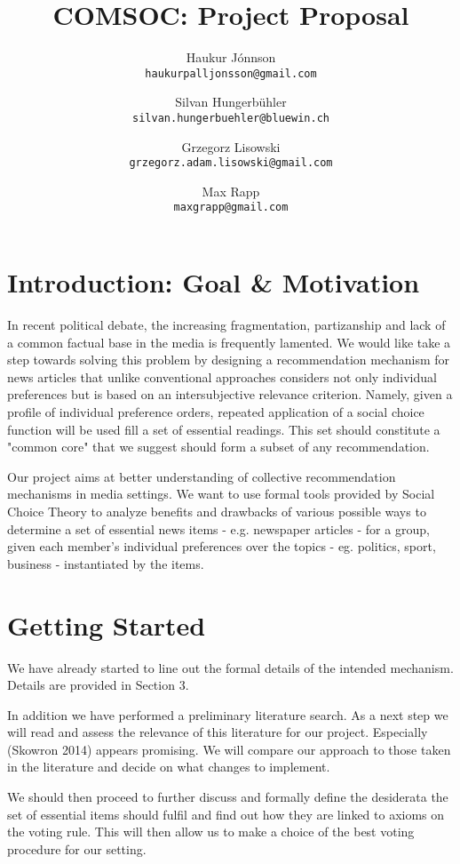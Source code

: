 \documentclass[10pt,a4paper, english]{article}
\author{
    Haukur J{\'o}nnson\\    \texttt{haukurpalljonsson@gmail.com}
    \and
    Silvan Hungerb{\"u}hler\\   \texttt{silvan.hungerbuehler@bluewin.ch}
    \and
    Grzegorz Lisowski\\  \texttt{grzegorz.adam.lisowski@gmail.com}
    \and
    Max Rapp\\  \texttt{maxgrapp@gmail.com}
}
\title{%
  COMSOC: Project Proposal}
\date{}
\begin{document}
\maketitle

\section{Introduction: Goal \& Motivation}

In recent political debate, the increasing fragmentation, partizanship and lack of a common factual base in the media is frequently lamented. We would like take a step towards solving this problem by designing a recommendation mechanism for news articles that unlike conventional approaches considers not only individual preferences but is based on an intersubjective relevance criterion. Namely, given a profile of individual preference orders, repeated application of a social choice function will be used fill a set of essential readings. This set should constitute a "common core" that we suggest should form a subset of any recommendation.

Our project aims at better understanding of collective recommendation mechanisms in media settings. We want to use formal tools provided by Social Choice Theory to analyze benefits and drawbacks of various possible ways to determine a set of essential news items - e.g. newspaper articles - for a group, given each member's individual preferences over the topics - eg. politics, sport, business - instantiated by the items.
\section{Getting Started}

We have already started to line out the formal details of the intended mechanism. Details are provided in Section 3.

In addition we have performed a preliminary literature search. As a next step we will read and assess the relevance of this literature for our project. Especially (Skowron 2014) appears promising. We will compare our approach to those taken in the literature and decide on what changes to implement.

We should then proceed to further discuss and formally define the desiderata the set of essential items should fulfil and find out how they are linked to axioms on the voting rule. This will then allow us to make a choice of the best voting procedure for our setting.
\end{document}
